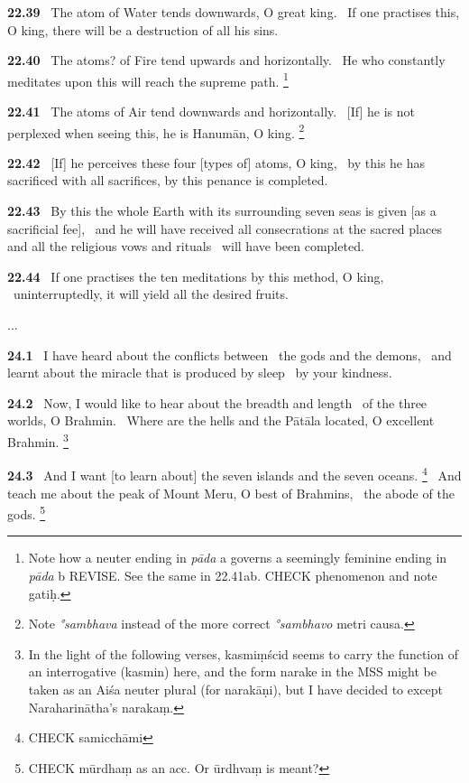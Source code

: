 \documentclass{article}
\newcommand{\skt}[1]{\textit{#1}}
\begin{document}
\textbf{22.39}%
\ The atom of Water tends downwards, O great king.%
\                  If one practises this, O king, there will be a destruction of all his sins.%


\textbf{22.40}%
\ The atoms? of Fire tend upwards and horizontally.%
\                 He who constantly meditates upon this will reach the supreme path.%
\footnote{Note how a neuter ending in \skt{pāda} a governs a seemingly feminine ending in \skt{pāda} b REVISE. See the                 same in 22.41ab. CHECK phenomenon and note gatiḥ. }%


\textbf{22.41}%
\ The atoms of Air tend downwards and horizontally.%
\                [If] he is not perplexed when seeing this, he is Hanumān, O king.%
\footnote{Note \skt{°sambhava} instead of the more correct \skt{°sambhavo} metri causa. }%


\textbf{22.42}%
\ [If] he perceives these four [types of] atoms, O king,%
\          by this he has sacrificed with all sacrifices, by this penance is completed.%


\textbf{22.43}%
\ By this the whole Earth with its surrounding seven seas is given [as a sacrificial fee],%
\                 and he will have received all consecrations at the sacred places and all the religious vows and rituals%
\                                         will have been completed.%


\textbf{22.44}%
\ If one practises the ten meditations by this method, O king,%
\                  uninterruptedly, it will yield all the desired fruits.%


...


\textbf{24.1}%
\ I have heard about the conflicts between%
\               the gods and the demons,%
\ and learnt about the miracle that is produced by sleep%
\                         by your kindness.%


\textbf{24.2}%
\ Now, I would like to hear about the breadth and length%
\              of the three worlds, O Brahmin.%
\ Where are the hells and the Pātāla located, O excellent Brahmin.%
\footnote{In the light of the following verses, kasmiṃścid seems to carry         the function of an interrogative (kasmin) here, and the form narake         in the MSS might be taken as an Aiśa neuter plural (for narakāṇi),         but I have decided to except Naraharinātha's narakaṃ. }%


\textbf{24.3}%
\ And I want [to learn about] the seven islands and the seven oceans.%
\footnote{CHECK samicchāmi }%
\ And teach me about the peak of Mount Meru, O best of Brahmins,%
\              the abode of the gods.%
\footnote{CHECK mūrdhaṃ as an acc. Or ūrdhvaṃ is meant? }%
\end{document}
